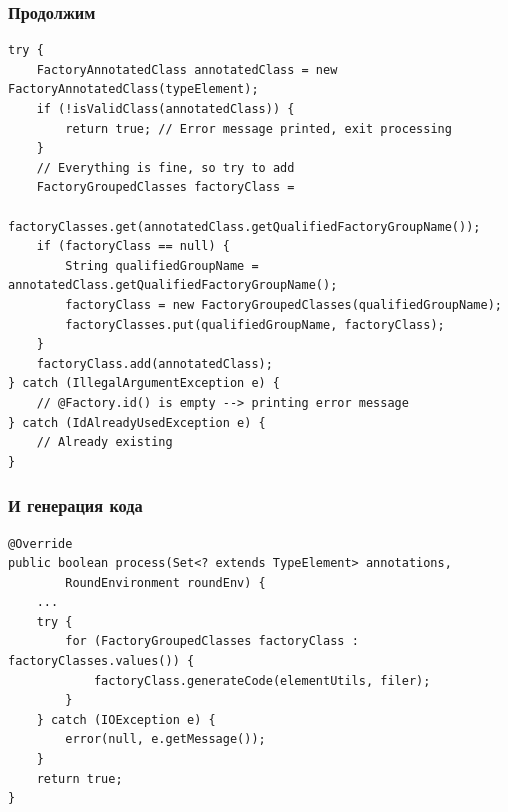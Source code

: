 \documentclass[xetex,mathserif,serif]{beamer}
\begin{document}
	\begin{frame}[fragile]
		\frametitle{Продолжим}
		\begin{footnotesize}
			\begin{verbatim}
try {
    FactoryAnnotatedClass annotatedClass = new FactoryAnnotatedClass(typeElement);
    if (!isValidClass(annotatedClass)) {
        return true; // Error message printed, exit processing
    }
    // Everything is fine, so try to add
    FactoryGroupedClasses factoryClass =
            factoryClasses.get(annotatedClass.getQualifiedFactoryGroupName());
    if (factoryClass == null) {
        String qualifiedGroupName = annotatedClass.getQualifiedFactoryGroupName();
        factoryClass = new FactoryGroupedClasses(qualifiedGroupName);
        factoryClasses.put(qualifiedGroupName, factoryClass);
    }
    factoryClass.add(annotatedClass);
} catch (IllegalArgumentException e) {
    // @Factory.id() is empty --> printing error message
} catch (IdAlreadyUsedException e) {
    // Already existing
}
			\end{verbatim}
		\end{footnotesize}
\end{frame}

	\begin{frame}[fragile]
		\frametitle{И генерация кода}
		\begin{footnotesize}
			\begin{verbatim}
@Override
public boolean process(Set<? extends TypeElement> annotations, 
        RoundEnvironment roundEnv) {
    ...
    try {
        for (FactoryGroupedClasses factoryClass : factoryClasses.values()) {
            factoryClass.generateCode(elementUtils, filer);
        }
    } catch (IOException e) {
        error(null, e.getMessage());
    }
    return true;
}
		\end{verbatim}
	\end{footnotesize}
\end{frame}
\end{document}
